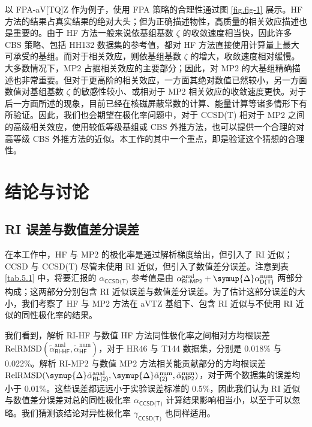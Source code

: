 以 FPA-aV[TQ]Z 作为例子，使用 FPA 策略的合理性通过图 \ref{fig.fig-1} 展示。HF 方法的结果占真实结果的绝对大头；但为正确描述物性，高质量的相关效应描述也是重要的。由于 HF 方法一般来说依基组基数 $\zeta$ 的收敛速度相当快\cite{Jensen-Jensen.TCA.2005, Karton-Martin.TCA.2006}，因此许多 CBS 策略、包括 HH132 数据集的参考值，都对 HF 方法直接使用计算量上最大可承受的基组。而对于相关效应，则依基组基数 $\zeta$ 的增大，收敛速度相对缓慢。大多数情况下，MP2 占据相关效应的主要部分；因此，对 MP2 的大基组精确描述也非常重要。但对于更高阶的相关效应，一方面其绝对数值已然较小，另一方面数值对基组基数 $\zeta$ 的敏感性较小、或相对于 MP2 相关效应的收敛速度更快。对于后一方面所述的现象，目前已经在核磁屏蔽常数的计算\cite{Sun-Xu.JCP.2013, Wang-Xu.JCP.2018, Gregusova-Bartlett.JCTC.2010}、能量计算\cite{Truhlar-Truhlar.CPL.1998}等诸多情形下有所验证。因此，我们也会期望在极化率问题中，对于 CCSD(T) 相对于 MP2 之间的高级相关效应，使用较低等级基组或 CBS 外推方法，也可以提供一个合理的对高等级 CBS 外推方法的近似。本工作的其中一个重点，即是验证这个猜想的合理性。

\section{结论与讨论}

\subsection{RI 误差与数值差分误差}
\label{sec.5.3.1}

在本工作中，HF 与 MP2 的极化率是通过解析梯度给出，但引入了 RI 近似；CCSD 与 CCSD(T) 尽管未使用 RI 近似，但引入了数值差分误差。注意到表 \ref{tab.5.1} 中，将要汇报的 $\alpha_\textsf{CCSD(T)}$ 参考值是由 $\alpha^\text{anal}_\textsf{RI-MP2} + \symup{\Delta} \alpha^\text{num}_\textsf{D(T)}$ 两部分构成；这两部分分别包含 RI 近似误差与数值差分误差。为了估计这部分误差的大小，我们考察了 HF 与 MP2 方法在 aVTZ 基组下、包含 RI 近似与不使用 RI 近似的同性极化率的结果。

我们看到，解析 RI-HF 与数值 HF 方法同性极化率之间相对方均根误差 $\text{RelRMSD} (\tilde \alpha_\textsf{RI-HF}^\text{anal}, \tilde \alpha^\text{num}_\textsf{HF})$，对于 HR46 与 T144 数据集，分别是 0.018\% 与 0.022\%。解析 RI-MP2 与数值 MP2 方法相关能贡献部分的方均根误差 $\text{RelRMSD} (\symup{\Delta} \tilde \alpha^\text{anal}_\textsf{RI-(2)}, \allowbreak \symup{\Delta} \tilde \alpha^\text{num}_\textsf{(2)}, \allowbreak \tilde \alpha^\text{num}_\textsf{MP2})$，对于两个数据集的误差均小于 0.01\%。这些误差都远远小于实验误差标准的 0.5\%，因此我们认为 RI 近似与数值差分误差对总的同性极化率 $\alpha_\textsf{CCSD(T)}$ 计算结果影响相当小，以至于可以忽略。我们猜测该结论对异性极化率 $\gamma_\textsf{CCSD(T)}$ 也同样适用。

